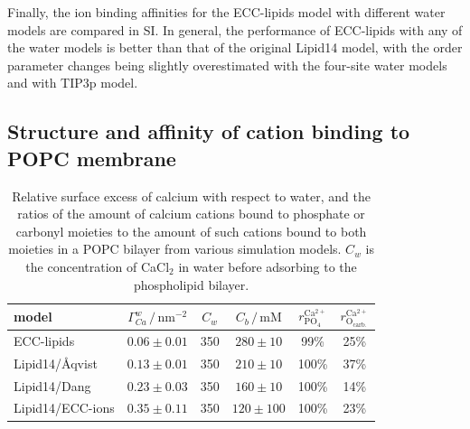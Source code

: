 \documentclass[aip,jcp,twocolumn]{revtex4}
\begin{document}
Finally, the ion binding affinities for the ECC-lipids model with different water models are compared in SI. 
In general, the performance of ECC-lipids with any of the water models 
is better than that of the original Lipid14 model, with the order parameter changes being slightly overestimated
with the four-site water models and with TIP3p model.







\subsection{Structure and affinity of cation binding to POPC membrane}
\label{sec:affinity}

\begin{table}[tb!]
  \caption{Relative surface excess of calcium with respect to water, 
  and the ratios of the amount of calcium cations 
  bound to phosphate or carbonyl moieties 
  to the amount of such cations bound to both moieties in a POPC bilayer 
  from various simulation models. 
  $C_w$ is the concentration of CaCl$_2$ in water before adsorbing to the phospholipid bilayer. 
  \label{tab:binding}}
  \begin{tabular}{l|c | c c | c c}
    model                 & $\Gamma_{Ca}^w \,/\, \mathrm{nm}^{-2}$ & $C_{w}$ & $C_b\,/\,\mathrm{mM}$   & $r^\mathrm{Ca^{2+}} _\mathrm{PO_4} $ & $r^\mathrm{Ca^{2+}} _\mathrm{O_{carb.}} $ \\
    \hline
    ECC-lipids            &  $0.06 \pm 0.01 $ &  350  &  $280\pm 10 $  &  99\%  &    25\%    \\
    Lipid14/\AA{}qvist    &  $0.13 \pm 0.01 $ &  350  &  $210\pm 10 $  & 100\%  &    37\%     \\
    Lipid14/Dang          &  $0.23 \pm 0.03 $ &  350  &  $160\pm 10 $  & 100\%  &    14\%    \\
    Lipid14/ECC-ions      &  $0.35 \pm 0.11 $ &  350  &  $120\pm 100$  & 100\%  &    23\%    \\
  \end{tabular}
\end{table}
\end{document}
